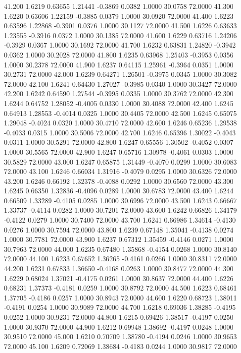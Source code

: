   41.200   1.6219   0.63655   1.21441  -0.3869   0.0382   1.0000  30.0758  72.0000
  41.300   1.6220   0.63606   1.22159  -0.3885   0.0379   1.0000  30.0920  72.0000
  41.400   1.6223   0.63596   1.22868  -0.3901   0.0376   1.0000  30.1127  72.0000
  41.500   1.6226   0.63633   1.23555  -0.3916   0.0372   1.0000  30.1385  72.0000
  41.600   1.6229   0.63716   1.24206  -0.3929   0.0367   1.0000  30.1692  72.0000
  41.700   1.6232   0.63831   1.24820  -0.3942   0.0362   1.0000  30.2028  72.0000
  41.800   1.6235   0.63968   1.25403  -0.3953   0.0356   1.0000  30.2378  72.0000
  41.900   1.6237   0.64115   1.25961  -0.3964   0.0351   1.0000  30.2731  72.0000
  42.000   1.6239   0.64271   1.26501  -0.3975   0.0345   1.0000  30.3082  72.0000
  42.100   1.6241   0.64430   1.27027  -0.3985   0.0340   1.0000  30.3427  72.0000
  42.200   1.6242   0.64590   1.27544  -0.3995   0.0335   1.0000  30.3762  72.0000
  42.300   1.6244   0.64752   1.28052  -0.4005   0.0330   1.0000  30.4088  72.0000
  42.400   1.6245   0.64913   1.28553  -0.4014   0.0325   1.0000  30.4405  72.0000
  42.500   1.6245   0.65075   1.29048  -0.4024   0.0320   1.0000  30.4710  72.0000
  42.600   1.6246   0.65236   1.29538  -0.4033   0.0315   1.0000  30.5006  72.0000
  42.700   1.6246   0.65396   1.30022  -0.4043   0.0311   1.0000  30.5291  72.0000
  42.800   1.6247   0.65556   1.30502  -0.4052   0.0307   1.0000  30.5565  72.0000
  42.900   1.6247   0.65716   1.30978  -0.4061   0.0303   1.0000  30.5829  72.0000
  43.000   1.6247   0.65875   1.31449  -0.4070   0.0299   1.0000  30.6083  72.0000
  43.100   1.6246   0.66034   1.31916  -0.4079   0.0295   1.0000  30.6326  72.0000
  43.200   1.6246   0.66192   1.32378  -0.4088   0.0292   1.0000  30.6560  72.0000
  43.300   1.6245   0.66350   1.32836  -0.4096   0.0289   1.0000  30.6783  72.0000
  43.400   1.6244   0.66509   1.33289  -0.4105   0.0285   1.0000  30.6996  72.0000
  43.500   1.6243   0.66667   1.33737  -0.4114   0.0282   1.0000  30.7201  72.0000
  43.600   1.6242   0.66826   1.34179  -0.4122   0.0279   1.0000  30.7400  72.0000
  43.700   1.6241   0.66986   1.34614  -0.4130   0.0276   1.0000  30.7594  72.0000
  43.800   1.6239   0.67148   1.35041  -0.4138   0.0274   1.0000  30.7781  72.0000
  43.900   1.6237   0.67312   1.35459  -0.4146   0.0271   1.0000  30.7963  72.0000
  44.000   1.6235   0.67480   1.35868  -0.4154   0.0268   1.0000  30.8140  72.0000
  44.100   1.6233   0.67652   1.36265  -0.4161   0.0266   1.0000  30.8311  72.0000
  44.200   1.6231   0.67833   1.36650  -0.4168   0.0263   1.0000  30.8477  72.0000
  44.300   1.6229   0.68024   1.37021  -0.4175   0.0261   1.0000  30.8637  72.0000
  44.400   1.6226   0.68231   1.37373  -0.4181   0.0259   1.0000  30.8792  72.0000
  44.500   1.6223   0.68461   1.37705  -0.4186   0.0257   1.0000  30.8943  72.0000
  44.600   1.6220   0.68723   1.38011  -0.4191   0.0254   1.0000  30.9089  72.0000
  44.700   1.6218   0.69036   1.38285  -0.4195   0.0252   1.0000  30.9231  72.0000
  44.800   1.6215   0.69426   1.38517  -0.4197   0.0250   1.0000  30.9370  72.0000
  44.900   1.6212   0.69948   1.38692  -0.4197   0.0248   1.0000  30.9510  72.0000
  45.000   1.6210   0.70709   1.38780  -0.4194   0.0246   1.0000  30.9653  72.0000
  45.100   1.6209   0.72069   1.38684  -0.4183   0.0244   1.0000  30.9817  72.0000
